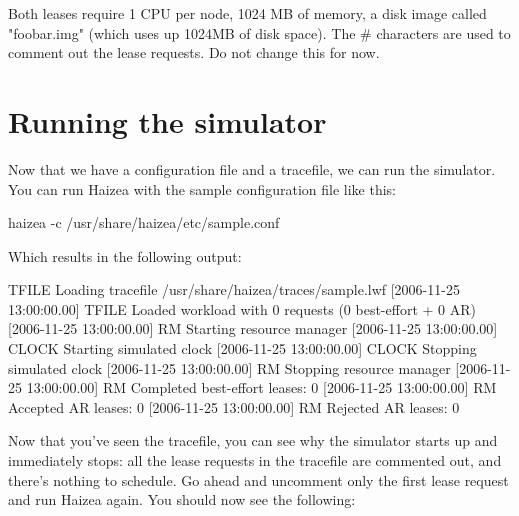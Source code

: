 Both leases require 1 CPU per node, 1024 MB of memory, a disk image called "foobar.img" (which uses up 1024MB of disk space). The \# characters are used to comment out the lease requests. Do not change this for now.

\section{Running the simulator}

Now that we have a configuration file and a tracefile, we can run the simulator. You can run Haizea with the sample configuration file like this:

\begin{shellverbatim}
haizea -c /usr/share/haizea/etc/sample.conf 
\end{shellverbatim}

Which results in the following output:

\begin{wideshellverbatim}
[2006-11-25 13:00:00.00] TFILE   Loading tracefile /usr/share/haizea/traces/sample.lwf
[2006-11-25 13:00:00.00] TFILE   Loaded workload with 0 requests (0 best-effort + 0 AR)
[2006-11-25 13:00:00.00] RM      Starting resource manager
[2006-11-25 13:00:00.00] CLOCK   Starting simulated clock
[2006-11-25 13:00:00.00] CLOCK   Stopping simulated clock
[2006-11-25 13:00:00.00] RM      Stopping resource manager
[2006-11-25 13:00:00.00] RM        Completed best-effort leases: 0
[2006-11-25 13:00:00.00] RM        Accepted AR leases: 0
[2006-11-25 13:00:00.00] RM        Rejected AR leases: 0
\end{wideshellverbatim}

Now that you've seen the tracefile, you can see why the simulator starts up and immediately stops: all the lease requests in the tracefile are commented out, and there's nothing to schedule. Go ahead and uncomment only the first lease request and run Haizea again. You should now see the following:

